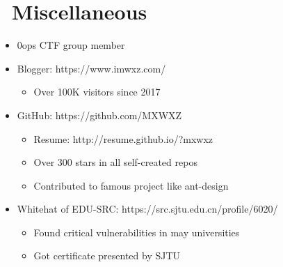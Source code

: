 \documentclass{resume}
\begin{document}
\section{\faInfo\ Miscellaneous}
\begin{itemize}[parsep=0.5ex]
    \item 0ops CTF group member
    \item Blogger: https://www.imwxz.com/
          \begin{itemize}
              \item Over 100K visitors since 2017
          \end{itemize}
    \item GitHub: https://github.com/MXWXZ
          \begin{itemize}
              \item Resume: http://resume.github.io/?mxwxz
              \item Over 300 stars in all self-created repos
              \item Contributed to famous project like ant-design
          \end{itemize}
    \item Whitehat of EDU-SRC: https://src.sjtu.edu.cn/profile/6020/
          \begin{itemize}
              \item Found critical vulnerabilities in may universities
              \item Got certificate presented by SJTU
          \end{itemize}
\end{itemize}

%
%
\end{document}
